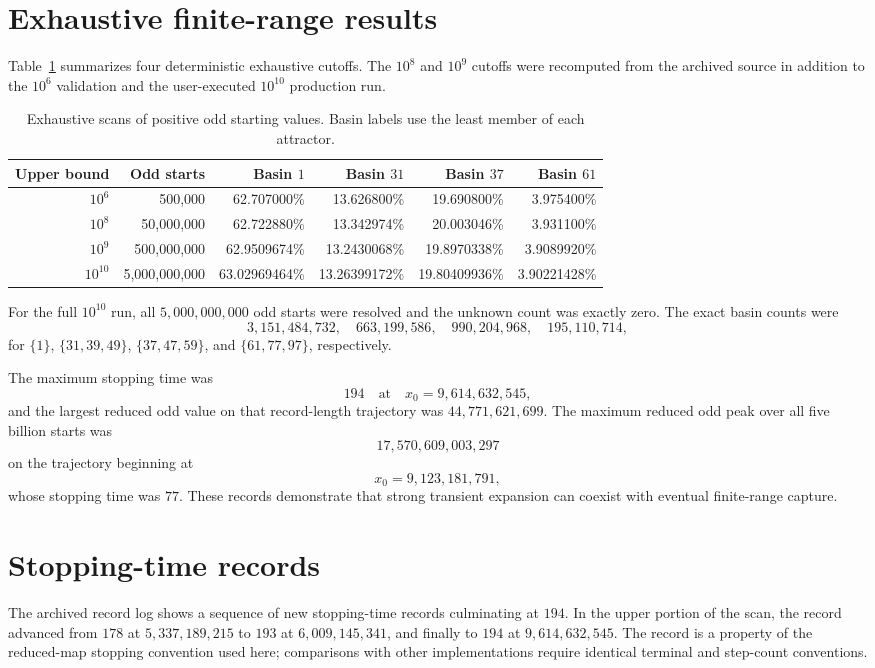 \documentclass[11pt]{article}
\begin{document}
\section{Exhaustive finite-range results}
Table~\ref{tab:cutoffs} summarizes four deterministic exhaustive cutoffs. The $10^8$ and $10^9$ cutoffs were recomputed from the archived source in addition to the $10^6$ validation and the user-executed $10^{10}$ production run.

\begin{table}[ht]
\centering
\small
\begin{tabular}{@{}rrrrrr@{}}
\toprule
Upper bound & Odd starts & Basin $1$ & Basin $31$ & Basin $37$ & Basin $61$\\
\midrule
$10^6$ & 500,000 & 62.707000\% & 13.626800\% & 19.690800\% & 3.975400\%\\
$10^8$ & 50,000,000 & 62.722880\% & 13.342974\% & 20.003046\% & 3.931100\%\\
$10^9$ & 500,000,000 & 62.9509674\% & 13.2430068\% & 19.8970338\% & 3.9089920\%\\
$10^{10}$ & 5,000,000,000 & 63.02969464\% & 13.26399172\% & 19.80409936\% & 3.90221428\%\\
\bottomrule
\end{tabular}
\caption{Exhaustive scans of positive odd starting values. Basin labels use the least member of each attractor.}
\label{tab:cutoffs}
\end{table}

For the full $10^{10}$ run, all $5,000,000,000$ odd starts were resolved and the unknown count was exactly zero. The exact basin counts were
\[
3,151,484,732,
\quad663,199,586,
\quad990,204,968,
\quad195,110,714,
\]
for $\{1\}$, $\{31,39,49\}$, $\{37,47,59\}$, and $\{61,77,97\}$, respectively.

The maximum stopping time was
\[
194\quad\text{at}\quad x_0=9,614,632,545,
\]
and the largest reduced odd value on that record-length trajectory was $44,771,621,699$. The maximum reduced odd peak over all five billion starts was
\[
17,570,609,003,297
\]
on the trajectory beginning at
\[
x_0=9,123,181,791,
\]
whose stopping time was $77$. These records demonstrate that strong transient expansion can coexist with eventual finite-range capture.

\section{Stopping-time records}
The archived record log shows a sequence of new stopping-time records culminating at $194$. In the upper portion of the scan, the record advanced from $178$ at $5,337,189,215$ to $193$ at $6,009,145,341$, and finally to $194$ at $9,614,632,545$. The record is a property of the reduced-map stopping convention used here; comparisons with other implementations require identical terminal and step-count conventions.
\end{document}
